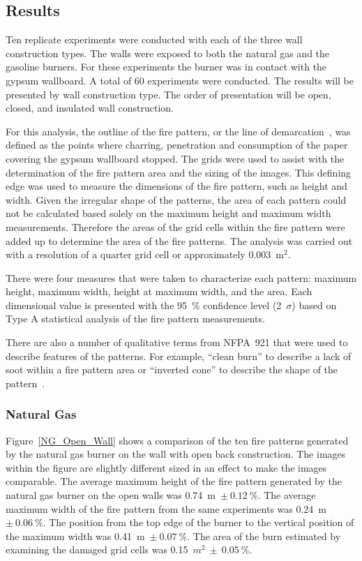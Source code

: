 \documentclass[twoside]{uocthesis}
\begin{document}
\subsection{Results}

Ten replicate experiments were conducted with each of the three wall construction types.  The walls were exposed to both the natural gas and the gasoline burners.  For these experiments the burner was in contact with the gypsum wallboard.  A total of 60 experiments were conducted.  The results will be presented by wall construction type.  The order of presentation will be open, closed, and insulated wall construction.  

For this analysis, the outline of the fire pattern, or the line of demarcation~\cite{NFPA:921}, was defined as the points where charring, penetration and consumption of the paper covering the gypsum wallboard stopped. The grids were used to assist with the determination of the fire pattern area and the sizing of the images. This defining edge was used to measure the dimensions of the fire pattern, such as height and width. Given the irregular shape of the patterns, the area of each pattern could not be calculated based solely on the maximum height and maximum width measurements. Therefore the areas of the grid cells within the fire pattern were added up to determine the area of the fire patterns.  The analysis was carried out with a resolution of a quarter grid cell or approximately 0.003~m$^2$. 

There were four measures that were taken to characterize each pattern: maximum height, maximum width, height at maximum width, and the area.  Each dimensional value is presented with the 95~\% confidence level (2~$\sigma$) based on Type A statistical analysis of the fire pattern measurements. 

There are also a number of qualitative terms from NFPA~921 that were used to describe features of the patterns.  For example, ``clean burn'' to describe a lack of soot within a fire pattern area or ``inverted cone'' to describe the shape of the pattern~\cite{NFPA:921}.      

\subsubsection{Natural Gas}

Figure~\ref{NG_Open_Wall} shows a comparison of the ten fire patterns generated by the natural gas burner on the wall with open back construction.  The images within the figure are slightly different sized in an effect to make the images comparable.
The average maximum height of the fire pattern generated by the natural gas burner on the open walls was 0.74~m~$\pm~0.12~\%$.  The average maximum width of the fire pattern from the same experiments was 0.24~m~$\pm~0.06~\%$.  The position from the top edge of the burner to the vertical position of the maximum width was 0.41~m~$\pm~0.07~\%$. The area of the burn estimated by examining the damaged grid cells was 0.15~$m^2~\pm~0.05~\%$.  
\end{document}
